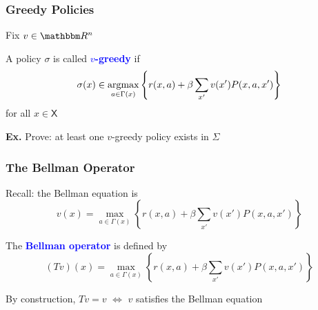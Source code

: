\documentclass[xcolor=dvipsnames]{beamer}
\newcommand{\navy}[1]{\textcolor{Blue}{\bf #1}}
\newcommand{\Ex}{{\bf Ex. }}
\newcommand{\RR}{\mathbbm R}
\newcommand{\Xsf}{\mathsf X}
\newcommand{\argmax}{\operatornamewithlimits{argmax}}
\newcommand{\1}{\mathbbm 1}
\begin{document}
\begin{frame}
    \frametitle{Greedy Policies}

    Fix $v \in \RR^n$ 
    
    \vspace{0.5em}
    \vspace{0.5em}
    \vspace{0.5em}
    A policy $\sigma$ is called
    \navy{$v$-greedy} if
    \begin{equation*}
        \sigma(x)
        \in \argmax_{a \in \Gamma(x)}
        \left\{
            r(x, a)
            + \beta
            \sum_{x'} v(x') P(x, a, x')
        \right\}
    \end{equation*}
    for all $x \in \Xsf$

    \vspace{0.5em}
    \vspace{0.5em}
    \vspace{0.5em}
    \Ex Prove: at least one $v$-greedy policy exists in $\Sigma$


\end{frame}


\begin{frame}
    \frametitle{The Bellman Operator}
    
    Recall: the Bellman equation is 
    \begin{equation*}
            v(x)
            = \max_{a \in \Gamma(x)}
            \left\{
                r(x, a)
                + \beta
                \sum_{x' } v(x') P(x, a, x')
            \right\}
    \end{equation*}

    \vspace{0.5em}
    The \navy{Bellman operator} is  defined by
    \begin{equation*}
        (Tv)(x)
            = \max_{a \in \Gamma(x)}
            \left\{
                r(x, a)
                + \beta
                \sum_{x' } v(x') P(x, a, x')
            \right\}
    \end{equation*}

    \vspace{0.5em}

    By construction, $Tv=v$ $\iff$ $v$  satisfies the Bellman equation

\end{frame}
\end{document}
